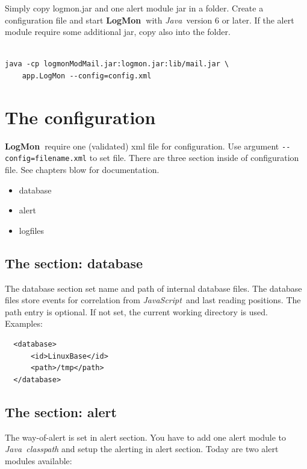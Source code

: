 \documentclass[11pt,a4paper]{article}
\newcommand{\logmon}{\textbf{LogMon\ }}
\newcommand{\js}{\textit{JavaScript\ }}
\newcommand{\java}{\textit{Java\ }}
\begin{document}
Simply copy logmon.jar and one alert module jar in a folder. Create a
configuration file and start \logmon with \java version 6 or later. If the
alert module require some additional jar, copy also into the folder.

\begin{verbatim}

java -cp logmonModMail.jar:logmon.jar:lib/mail.jar \
    app.LogMon --config=config.xml

\end{verbatim}

\section{The configuration}
\label{sec:conf}

\logmon require one (validated) xml file for configuration. Use argument
 \verb#--config=filename.xml# to set file.
There are three section inside of configuration file. See chapters blow for documentation.

\begin{itemize}
  \item database
  \item alert
  \item logfiles
\end{itemize}

\subsection{The section: database}
\label{sec:cfgdb}

The database section set name and path of internal database files. The database files store events for
correlation from \js and last reading positions. The path entry is optional. If not set, the current working
directory is used. Examples:

\begin{verbatim}
  <database>
      <id>LinuxBase</id>
      <path>/tmp</path>
  </database>
\end{verbatim}

\subsection{The section: alert}

The way-of-alert is set in alert section. You have to add one alert module to \java \textit{classpath}
and setup the alerting in alert section. Today are two alert modules available:
\end{document}
